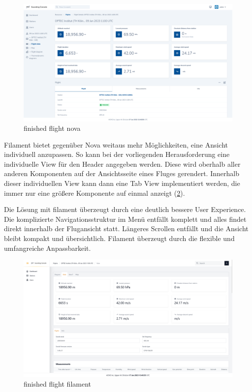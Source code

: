 \begin{figure}[h!]
    \centering
    \caption{finished flight nova}
    \label{fig:finished_flight_nova}
    \includegraphics[scale=0.25]{assets/finished_flight_nova}
\end{figure}

Filament bietet gegenüber Nova weitaus mehr Möglichkeiten, eine Ansicht individuell anzupassen.
So kann bei der vorliegenden Herausforderung eine individuelle View für den Header angegeben werden.
Diese wird oberhalb aller anderen Komponenten auf der Ansichtsseite eines Fluges gerendert.
Innerhalb dieser individuellen View kann dann eine Tab View implementiert werden, die immer nur eine größere Komponente auf einmal anzeigt (\ref{fig:finished_flight_filament}).

Die Lösung mit filament überzeugt durch eine deutlich bessere User Experience.
Die komplizierte Navigationsstruktur im Menü entfällt komplett und alles findet direkt innerhalb der Flugansicht statt.
Längeres Scrollen entfällt und die Ansicht bleibt kompakt und übersichtlich.
Filament überzeugt durch die flexible und umfangreiche Anpassbarkeit.

\begin{figure}[h!]
    \centering
    \caption{finished flight filament}
    \label{fig:finished_flight_filament}
    \includegraphics[scale=0.25]{assets/finished_flight_filament}
\end{figure}

